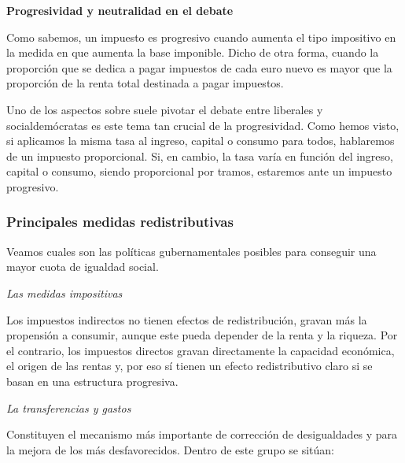 \documentclass[
]{article}
\begin{document}
\textbf{Progresividad y neutralidad en el debate}

Como sabemos, un impuesto es progresivo cuando aumenta el tipo
impositivo en la medida en que aumenta la base imponible. Dicho de otra
forma, cuando la proporción que se dedica a pagar impuestos de cada euro
nuevo es mayor que la proporción de la renta total destinada a pagar
impuestos.

Uno de los aspectos sobre suele pivotar el debate entre liberales y
socialdemócratas es este tema tan crucial de la progresividad. Como
hemos visto, si aplicamos la misma tasa al ingreso, capital o consumo
para todos, hablaremos de un impuesto proporcional. Si, en cambio, la
tasa varía en función del ingreso, capital o consumo, siendo
proporcional por tramos, estaremos ante un impuesto progresivo.

\hypertarget{principales-medidas-redistributivas}{%
\subsubsection{Principales medidas
redistributivas}\label{principales-medidas-redistributivas}}

Veamos cuales son las políticas gubernamentales posibles para conseguir
una mayor cuota de igualdad social.

\emph{Las medidas impositivas}

Los impuestos indirectos no tienen efectos de redistribución, gravan más
la propensión a consumir, aunque este pueda depender de la renta y la
riqueza. Por el contrario, los impuestos directos gravan directamente la
capacidad económica, el origen de las rentas y, por eso sí tienen un
efecto redistributivo claro si se basan en una estructura progresiva.

\emph{La transferencias y gastos}

Constituyen el mecanismo más importante de corrección de desigualdades y
para la mejora de los más desfavorecidos. Dentro de este grupo se
sitúan:
\end{document}
